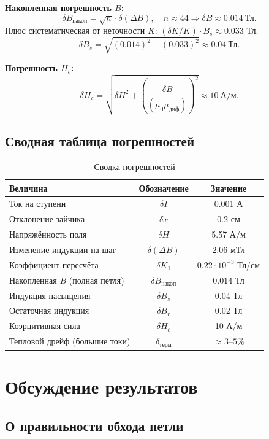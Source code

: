 \documentclass[a4paper]{article}
\begin{document}
	\textbf{Накопленная погрешность $B$:}
	\[
	\delta B_{\text{накоп}} = \sqrt{n} \cdot \delta(\Delta B), \quad n \approx 44 \Rightarrow \delta B \approx 0.014 \ \text{Тл}.
	\]
	Плюс систематическая от неточности $K$: $(\delta K/K) \cdot B_s \approx 0.033$ Тл.
	\[
	\delta B_s = \sqrt{(0.014)^2 + (0.033)^2} \approx 0.04 \ \text{Тл}.
	\]
	
	\textbf{Погрешность $H_c$:}
	\[
	\delta H_c = \sqrt{\delta H^2 + \left(\frac{\delta B}{(\mu_0\mu_{\text{диф}})}\right)^2} \approx 10 \ \text{А/м}.
	\]
	
	\subsection{Сводная таблица погрешностей}
	
	\begin{table}[h]
		\centering
		\caption{Сводка погрешностей}
		\label{tab:errors_summary}
		\begin{tabular}{|l|c|c|}
			\hline
			Величина & Обозначение & Значение \\
			\hline
			Ток на ступени & $\delta I$ & 0.001 А \\
			\hline
			Отклонение зайчика & $\delta x$ & 0.2 см \\
			\hline
			Напряжённость поля & $\delta H$ & 5.57 А/м \\
			\hline
			Изменение индукции на шаг & $\delta(\Delta B)$ & 2.06 мТл \\
			\hline
			Коэффициент пересчёта & $\delta K_1$ & $0.22\cdot 10^{-3}$ Тл/см \\
			\hline
			Накопленная $B$ (полная петля) & $\delta B_{\text{накоп}}$ & 0.014 Тл \\
			\hline
			Индукция насыщения & $\delta B_s$ & 0.04 Тл \\
			\hline
			Остаточная индукция & $\delta B_r$ & 0.02 Тл \\
			\hline
			Коэрцитивная сила & $\delta H_c$ & 10 А/м \\
			\hline
			Тепловой дрейф (большие токи) & $\delta_{\text{терм}}$ & $\approx 3$--$5\%$ \\
			\hline
		\end{tabular}
	\end{table}
	
	\section{Обсуждение результатов}
	
	\subsection{О правильности обхода петли}
	
\end{document}

